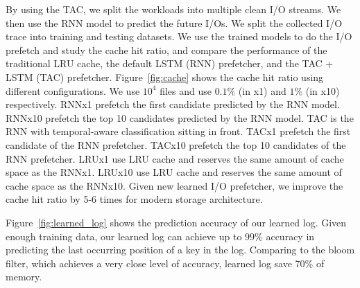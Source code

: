 By using the TAC, we split the workloads into multiple clean I/O streams.
We then use the RNN model to predict the future I/Os.
We split the collected I/O trace into training and testing datasets.
We use the trained models to do the I/O prefetch and study the cache hit ratio,
and compare the performance of the traditional LRU cache,
the default LSTM (RNN) prefetcher, and the TAC + LSTM (TAC) prefetcher.
Figure~\ref{fig:cache} shows the cache hit ratio using different configurations.
We use $10^4$ files and use $0.1\%$ (in x1) and $1\%$ (in x10) respectively.
RNNx1 prefetch the first candidate predicted by the RNN model.
RNNx10 prefetch the top 10 candidates predicted by the RNN model.
TAC is the RNN with temporal-aware classification sitting in front.
TACx1 prefetch the first candidate of the RNN prefetcher.
TACx10 prefetch the top 10 candidates of the RNN prefetcher.
LRUx1 use LRU cache and reserves the same amount of cache space as the RNNx1.
LRUx10 use LRU cache and reserves the same amount of cache space as the RNNx10.
Given new learned I/O prefetcher,
we improve the cache hit ratio by 5-6 times for modern storage architecture.

Figure~\ref{fig:learned_log} shows the prediction accuracy of our learned log.
Given enough training data, our learned log can achieve up to $99\%$ accuracy
in predicting the last occurring position of a key in the log.
Comparing to the bloom filter, which achieves a very close level of accuracy, learned log save 70\% of memory.

